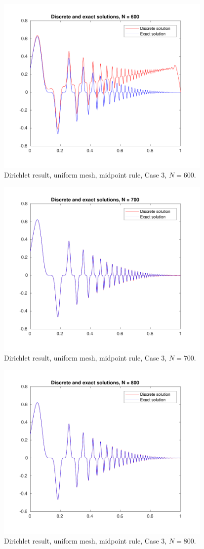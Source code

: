 \documentclass[a4paper]{article}
\numberwithin{equation}{section}
\begin{document}
\begin{figure}[H]
\centering\includegraphics[width=10.5cm]{fig_dirichlet_result_uniform_midpoint_N600_C3}
\caption{Dirichlet result, uniform mesh, midpoint rule, Case 3, $N=600$.}
\end{figure}
\begin{figure}[H]
\centering\includegraphics[width=10.5cm]{fig_dirichlet_result_uniform_midpoint_N700_C3}
\caption{Dirichlet result, uniform mesh, midpoint rule, Case 3, $N=700$.}
\end{figure}
\begin{figure}[H]
\centering\includegraphics[width=10.5cm]{fig_dirichlet_result_uniform_midpoint_N800_C3}
\caption{Dirichlet result, uniform mesh, midpoint rule, Case 3, $N=800$.}
\end{figure}
\newpage
\end{document}
